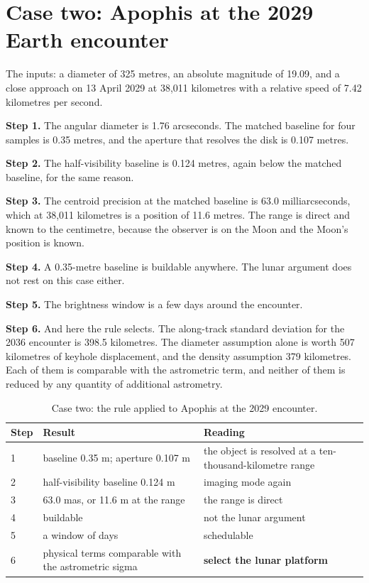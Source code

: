 \section{Case two: Apophis at the 2029 Earth encounter}

The inputs: a diameter of 325 metres, an absolute magnitude of 19.09, and a
close approach on 13 April 2029 at 38,011 kilometres with a relative speed
of 7.42 kilometres per second.

\textbf{Step 1.} The angular diameter is 1.76 arcseconds. The matched
baseline for four samples is 0.35 metres, and the aperture that resolves
the disk is 0.107 metres.

\textbf{Step 2.} The half-visibility baseline is 0.124 metres, again below
the matched baseline, for the same reason.

\textbf{Step 3.} The centroid precision at the matched baseline is 63.0
milliarcseconds, which at 38,011 kilometres is a position of 11.6 metres.
The range is direct and known to the centimetre, because the observer is on
the Moon and the Moon's position is known.

\textbf{Step 4.} A 0.35-metre baseline is buildable anywhere. The lunar
argument does not rest on this case either.

\textbf{Step 5.} The brightness window is a few days around the encounter.

\textbf{Step 6.} And here the rule selects. The along-track standard
deviation for the 2036 encounter is 398.5 kilometres. The diameter
assumption alone is worth 507 kilometres of keyhole displacement, and the
density assumption 379 kilometres. Each of them is comparable with the
astrometric term, and neither of them is reduced by any quantity of
additional astrometry.

\begin{table}[!htbp]
\centering
\small
\caption{Case two: the rule applied to Apophis at the 2029 encounter.}
\label{tab:case2}
\begin{tabularx}{\textwidth}{@{}P{0.61in}P{1.95in}Y@{}}
\toprule
{}
\textbf{Step} & \textbf{Result} & \textbf{Reading} \\
 & baseline 0.35 m; aperture 0.107 m & the object is resolved at a
ten-thousand-kilometre range \\
2 & half-visibility baseline 0.124 m & imaging mode again \\
3 & 63.0 mas, or 11.6 m at the range & the range is direct \\
4 & buildable & not the lunar argument \\
5 & a window of days & schedulable \\
6 & physical terms comparable with the astrometric sigma & \textbf{select
the lunar platform} \\
\bottomrule
\end{tabularx}
\end{table}

